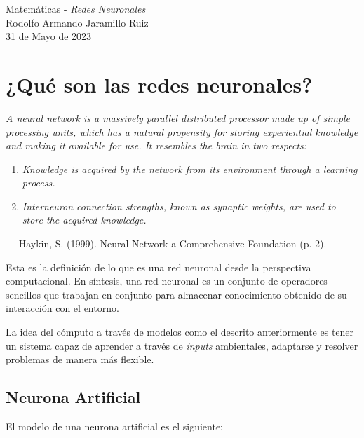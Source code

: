 \documentclass[14pt,a4paper]{report}
\begin{document}
\newcommand{\commentedbox}[2]{%
  \mbox{
    \begin{tabular}[t]{@{}c@{}}
    $\boxed{\displaystyle#1}$\\
    #2
    \end{tabular}%
  }%
}
\pagestyle{fancy}
\Large{Matemáticas - \textit{Redes Neuronales}}\\
\normalsize
Rodolfo Armando Jaramillo Ruiz\\
31 de Mayo de 2023\\
\section*{¿Qué son las redes neuronales?}
\textit{A neural network is a massively parallel distributed processor made up of simple processing units, which has a natural propensity for storing experiential knowledge and making it available for use. It resembles the brain in two respects:}

\begin{enumerate}
\item \textit{Knowledge is acquired by the network from its environment through a learning process.}
\item \textit{Interneuron connection strengths, known as synaptic weights, are used to store the acquired knowledge.}
\end{enumerate}

— Haykin, S. (1999). Neural Network a Comprehensive Foundation (p. 2).

Esta es la definición de lo que es una red neuronal desde la perspectiva computacional. En síntesis, una red neuronal es un conjunto de operadores sencillos que trabajan en conjunto para almacenar conocimiento obtenido de su interacción con el entorno.

La idea del cómputo a través de modelos como el descrito anteriormente es tener un sistema capaz de aprender a través de \textit{inputs} ambientales, adaptarse y resolver problemas de manera más flexible.

\subsection*{Neurona Artificial}

El modelo de una neurona artificial es el siguiente:
\end{document}
